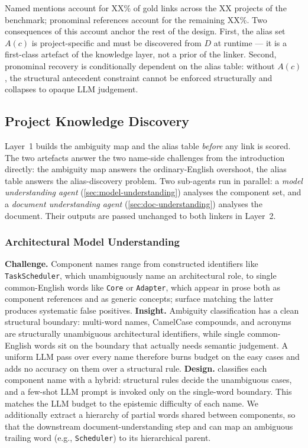 Named mentions account for XX\% of gold links across the XX projects of the benchmark; pronominal references account for the remaining XX\%.
Two consequences of this account anchor the rest of the design.
First, the alias set $A(c)$ is project-specific and must be discovered from $D$ at runtime --- it is a first-class artefact of the knowledge layer, not a prior of the linker.
Second, pronominal recovery is conditionally dependent on the alias table: without $A(c)$, the structural antecedent constraint cannot be enforced structurally and collapses to opaque \ac{LLM} judgement.

\subsection{Project Knowledge Discovery}\label{sec:knowledge}

Layer~1 builds the ambiguity map and the alias table \emph{before} any link is scored.
The two artefacts answer the two name-side challenges from the introduction directly: the ambiguity map answers the ordinary-English overshoot, the alias table answers the alias-discovery problem.
Two sub-agents run in parallel: a \emph{model understanding agent} (\autoref{sec:model-understanding}) analyses the component set, and a \emph{document understanding agent} (\autoref{sec:doc-understanding}) analyses the document.
Their outputs are passed unchanged to both linkers in Layer~2.

\subsubsection{Architectural Model Understanding}\label{sec:model-understanding}

\textbf{Challenge.} Component names range from constructed identifiers like \texttt{TaskScheduler}, which unambiguously name an architectural role, to single common-English words like \texttt{Core} or \texttt{Adapter}, which appear in prose both as component references and as generic concepts; surface matching the latter produces systematic false positives.
\textbf{Insight.} Ambiguity classification has a clean structural boundary: multi-word names, CamelCase compounds, and acronyms are structurally unambiguous architectural identifiers, while single common-English words sit on the boundary that actually needs semantic judgement.
A uniform \ac{LLM} pass over every name therefore burns budget on the easy cases and adds no accuracy on them over a structural rule.
\textbf{Design.} \approach classifies each component name with a hybrid: structural rules decide the unambiguous cases, and a few-shot \ac{LLM} prompt is invoked only on the single-word boundary.
This matches the \ac{LLM} budget to the epistemic difficulty of each name.
We additionally extract a hierarchy of partial words shared between components, so that the downstream document-understanding step and \linkerC can map an ambiguous trailing word (e.g., \texttt{Scheduler}) to its hierarchical parent.

